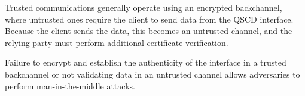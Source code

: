 Trusted communications generally operate using an encrypted backchannel, where untrusted ones require the client to send data from the QSCD interface. Because the client sends the data, this becomes an untrusted channel, and the relying party must perform additional certificate verification.

Failure to encrypt and establish the authenticity of the interface in a trusted backchannel or not validating data in an untrusted channel allows adversaries to perform man-in-the-middle attacks.


